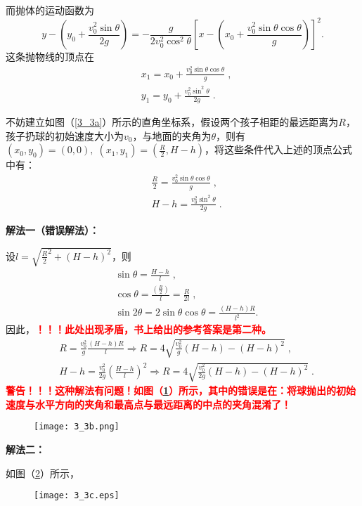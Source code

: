 \noindent
而抛体的运动函数为
\[
y - \left(y_0 + \frac{v_0^2\sin\theta}{2g}\right) = - \frac{g}{2v_0^2\cos^2\theta}\left[x - \left(x_0 + \frac{v_0^2\sin	\theta \cos\theta}{g}\right)\right]^2.
\]
这条抛物线的顶点在
\[
\begin{aligned}
&x_1 = x_0 + \frac{v_0^2\sin \theta\cos \theta}{g}\;, \\
&y_1 = y_0 + \frac{v_0^2 \sin^2 \theta}{2g}\;.
\end{aligned}
\]

不妨建立如图（\ref{3_3a}）所示的直角坐标系，假设两个孩子相距的最远距离为$R$，孩子扔球的初始速度大小为$v_0$，与地面的夹角为$\theta$，则有$(x_0, y_0) = (0, 0),\;(x_1,y_1) = (\frac{R}{2},H-h)$，将这些条件代入上述的顶点公式中有：
\[
\begin{aligned}
&\frac{R}{2} = \frac{v_0^2\sin \theta\cos \theta}{g}\;, \\
&H-h = \frac{v_0^2 \sin^2 \theta}{2g}\;.
\end{aligned}
\]

\newpage
\noindent
{\bfseries 解法一（错误解法）：}\par
设$l = \sqrt{\frac{R}{2}^2 +(H-h)^2}$，则
\[
\begin{aligned}
&\sin \theta = \frac{H-h}{l}\;, \\
&\cos \theta = \frac{(\frac{R}{2})}{l} = \frac{R}{2l}\;,\\
& \sin 2\theta = 2\sin \theta \cos \theta = \frac{(H-h)R}{l^2}.
\end{aligned}
\]
因此，{\bfseries\textcolor{red}{！！！此处出现矛盾，书上给出的参考答案是第二种。}}
\[
\begin{aligned}
&R = \frac{v_0^2}{g}\frac{(H-h)R}{l} \Rightarrow R = 4\sqrt{\frac{v_0^2}{g}(H-h) - (H-h)^2}\;,\\
&H-h = \frac{v_0^2}{2g}\left(\frac{H-h}{l}\right)^2 \Rightarrow R = 4\sqrt{\frac{v_0^2}{2g}(H-h) - (H-h)^2}\;.
\end{aligned}
\]
{\bfseries\textcolor{red}{警告！！！这种解法有问题！如图（\ref{3_3b}）所示，其中的错误是在：将球抛出的初始速度与水平方向的夹角和最高点与最远距离的中点的夹角混淆了！}}


\begin{figure}[htbp]
	\centering
	\texttt{[image: 3\_3b.png]}
	\caption{}
	\label{3_3b}
\end{figure}

\newpage
\noindent
{\bfseries 解法二：}\par
如图（\ref{3_3c}）所示，

\begin{figure}[htbp]
	\centering
	\texttt{[image: 3\_3c.eps]}
	\caption{}
	\label{3_3c}
\end{figure}

